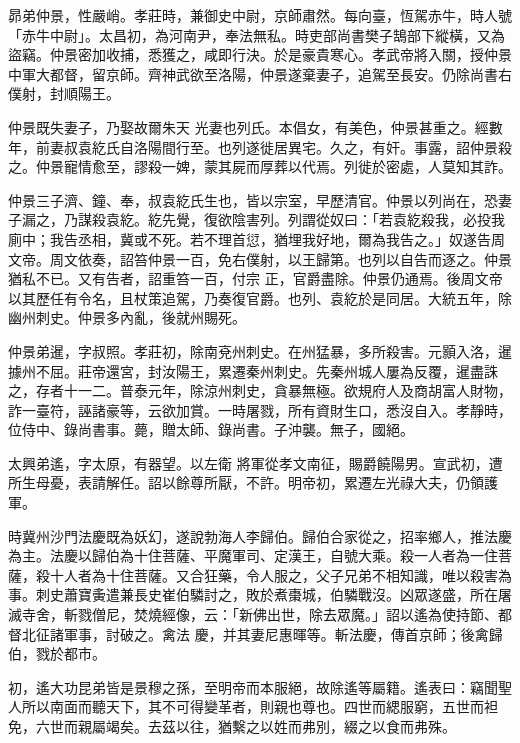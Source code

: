 \begin{pinyinscope}
 昴弟仲景，性嚴峭。孝莊時，兼御史中尉，京師肅然。每向臺，恆駕赤牛，時人號「赤牛中尉」。太昌初，為河南尹，奉法無私。時吏部尚書樊子鵠部下縱橫，又為盜竊。仲景密加收捕，悉獲之，咸即行決。於是豪貴寒心。孝武帝將入關，授仲景中軍大都督，留京師。齊神武欲至洛陽，仲景遂棄妻子，追駕至長安。仍除尚書右僕射，封順陽王。



 仲景既失妻子，乃娶故爾朱天
 光妻也列氏。本倡女，有美色，仲景甚重之。經數年，前妻叔袁紇氏自洛陽間行至。也列遂徙居異宅。久之，有奸。事露，詔仲景殺之。仲景寵情愈至，謬殺一婢，蒙其屍而厚葬以代焉。列徙於密處，人莫知其詐。



 仲景三子濟、鐘、奉，叔袁紇氏生也，皆以宗室，早歷清官。仲景以列尚在，恐妻子漏之，乃謀殺袁紇。紇先覺，復欲陰害列。列謂從奴曰：「若袁紇殺我，必投我廁中；我告丞相，冀或不死。若不理首愆，猶埋我好地，爾為我告之。」奴遂告周文帝。周文依奏，詔笞仲景一百，免右僕射，以王歸第。也列以自告而逐之。仲景猶私不已。又有告者，詔重笞一百，付宗
 正，官爵盡除。仲景仍通焉。後周文帝以其歷任有令名，且杖策追駕，乃奏復官爵。也列、袁紇於是同居。大統五年，除幽州刺史。仲景多內亂，後就州賜死。



 仲景弟暹，字叔照。孝莊初，除南兗州刺史。在州猛暴，多所殺害。元顥入洛，暹據州不屈。莊帝還宮，封汝陽王，累遷秦州刺史。先秦州城人屢為反覆，暹盡誅之，存者十一二。普泰元年，除涼州刺史，貪暴無極。欲規府人及商胡富人財物，詐一臺符，誣諸豪等，云欲加賞。一時屠戮，所有資財生口，悉沒自入。孝靜時，位侍中、錄尚書事。薨，贈太師、錄尚書。子沖襲。無子，國絕。



 太興弟遙，字太原，有器望。以左衛
 將軍從孝文南征，賜爵饒陽男。宣武初，遭所生母憂，表請解任。詔以餘尊所厭，不許。明帝初，累遷左光祿大夫，仍領護軍。



 時冀州沙門法慶既為妖幻，遂說勃海人李歸伯。歸伯合家從之，招率鄉人，推法慶為主。法慶以歸伯為十住菩薩、平魔軍司、定漢王，自號大乘。殺一人者為一住菩薩，殺十人者為十住菩薩。又合狂藥，令人服之，父子兄弟不相知識，唯以殺害為事。刺史蕭寶夤遣兼長史崔伯驎討之，敗於煮棗城，伯驎戰沒。凶眾遂盛，所在屠滅寺舍，斬戮僧尼，焚燒經像，云：「新佛出世，除去眾魔。」詔以遙為使持節、都督北征諸軍事，討破之。禽法
 慶，并其妻尼惠暉等。斬法慶，傳首京師；後禽歸伯，戮於都市。



 初，遙大功昆弟皆是景穆之孫，至明帝而本服絕，故除遙等屬籍。遙表曰：竊聞聖人所以南面而聽天下，其不可得變革者，則親也尊也。四世而緦服窮，五世而袒免，六世而親屬竭矣。去茲以往，猶繫之以姓而弗別，綴之以食而弗殊。




\end{pinyinscope}
